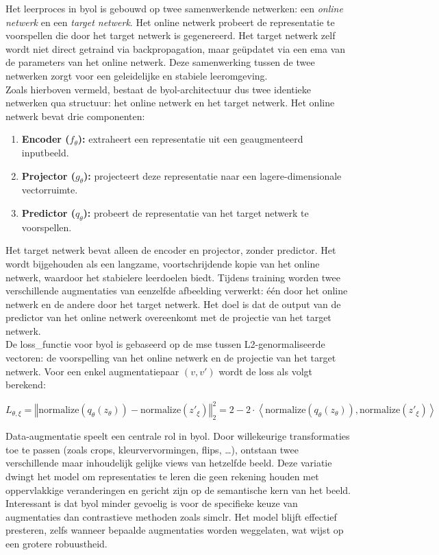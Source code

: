 Het leerproces in \gls{byol} is gebouwd op twee samenwerkende netwerken: een \emph{online netwerk} en een \emph{target netwerk}. Het online netwerk probeert de representatie te voorspellen die door het target netwerk is gegenereerd. Het target netwerk zelf wordt niet direct getraind via \gls{backpropagation}, maar geüpdatet via een \gls{ema} van de parameters van het online netwerk. Deze samenwerking tussen de twee netwerken zorgt voor een geleidelijke en stabiele leeromgeving. \\

Zoals hierboven vermeld, bestaat de \gls{byol}-architectuur dus twee identieke netwerken qua structuur: het online netwerk en het target netwerk. Het online netwerk bevat drie componenten:

\begin{enumerate}
    \item \textbf{Encoder ($f_\theta$):} extraheert een representatie uit een geaugmenteerd inputbeeld.
    \item \textbf{Projector ($g_\theta$):} projecteert deze representatie naar een lagere-dimensionale vectorruimte.
    \item \textbf{Predictor ($q_\theta$):} probeert de representatie van het target netwerk te voorspellen.
\end{enumerate}

Het target netwerk bevat alleen de encoder en projector, zonder predictor. Het wordt bijgehouden als een langzame, voortschrijdende kopie van het online netwerk, waardoor het stabielere leerdoelen biedt. Tijdens training worden twee verschillende augmentaties van eenzelfde afbeelding verwerkt: één door het online netwerk en de andere door het target netwerk. Het doel is dat de output van de predictor van het online netwerk overeenkomt met de projectie van het target netwerk. \\

De \gls{loss_functie} voor \gls{byol} is gebaseerd op de \gls{mse} tussen L2-genormaliseerde vectoren: de voorspelling van het online netwerk en de projectie van het target netwerk. Voor een enkel augmentatiepaar $(v, v')$ wordt de loss als volgt berekend:

$$
L_{\theta, \xi} = \left\Vert \text{normalize}\left(q_\theta\left(z_\theta\right)\right) - \text{normalize}\left(z'_\xi\right) \right\Vert^2_2 = 2 - 2 \cdot \left\langle \text{normalize}\left(q_\theta\left(z_\theta\right)\right), \text{normalize}\left(z'_\xi\right) \right\rangle
$$

Data-augmentatie speelt een centrale rol in \gls{byol}. Door willekeurige transformaties toe te passen (zoals crops, kleurvervormingen, flips, \dots), ontstaan twee verschillende maar inhoudelijk gelijke views van hetzelfde beeld. Deze variatie dwingt het model om representaties te leren die geen rekening houden met oppervlakkige veranderingen en gericht zijn op de semantische kern van het beeld. Interessant is dat \gls{byol} minder gevoelig is voor de specifieke keuze van augmentaties dan contrastieve methoden zoals \gls{simclr}. Het model blijft effectief presteren, zelfs wanneer bepaalde augmentaties worden weggelaten, wat wijst op een grotere robuustheid.